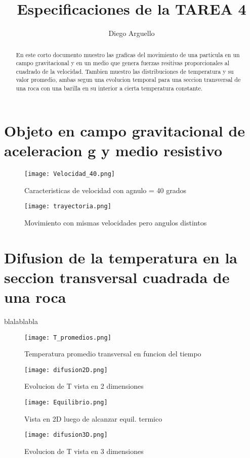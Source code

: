 \documentclass[13pts]{article}
\author{Diego Arguello}
\title{Especificaciones de la TAREA 4}
\begin{document}
\maketitle
\begin{abstract}
En este corto documento muestro las graficas del movimiento de una particula en un campo gravitacional y en un medio que genera fuerzas resitivas proporcionales al cuadrado de la velocidad. Tambien muestro las distribuciones de temperatura y su valor promedio, ambas segun una evolucion temporal para una seccion transversal de una roca con una barilla en su interior a cierta temperatura constante.
\end{abstract}

\section{Objeto en campo gravitacional de aceleracion g y medio resistivo}

\begin{figure}
	\centering
	\texttt{[image: Velocidad\_40.png]}
	\caption[scale=0.01]{Caracteristicas de velocidad con agnulo = 40 grados}
	\label{40}
\end{figure}

\begin{figure}
	\centering
	\texttt{[image: trayectoria.png]}
	\caption{Movimiento con mismas velocidades pero angulos distintos}
	\label{trayect}
\end{figure}


\section{Difusion de la temperatura en la seccion transversal cuadrada de una roca}
blalablabla

\begin{figure}
	\centering
	\texttt{[image: T\_promedios.png]}
	\caption{Temperatura promedio transversal en funcion del tiempo}
	\label{promedio}
\end{figure}

\begin{figure}
	\centering
	\texttt{[image: difusion2D.png]}
	\caption{Evolucion de T vista en 2 dimensiones}
	\label{2D}
\end{figure}

\begin{figure}
	\centering
	\texttt{[image: Equilibrio.png]}
	\caption{Vista en 2D luego de alcanzar equil. termico}
	\label{2D}
\end{figure}

\begin{figure}
	\centering
	\texttt{[image: difusion3D.png]}
	\caption{Evolucion de T vista en 3 dimensiones}
	\label{2D}
\end{figure}
\end{document}
